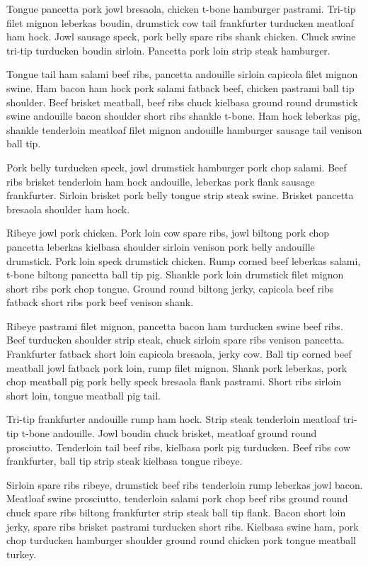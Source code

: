 Tongue pancetta pork jowl bresaola, chicken t-bone hamburger pastrami. Tri-tip filet mignon leberkas boudin, drumstick cow tail frankfurter turducken meatloaf ham hock. Jowl sausage speck, pork belly spare ribs shank chicken. Chuck swine tri-tip turducken boudin sirloin. Pancetta pork loin strip steak hamburger.

Tongue tail ham salami beef ribs, pancetta andouille sirloin capicola filet mignon swine. Ham bacon ham hock pork salami fatback beef, chicken pastrami ball tip shoulder. Beef brisket meatball, beef ribs chuck kielbasa ground round drumstick swine andouille bacon shoulder short ribs shankle t-bone. Ham hock leberkas pig, shankle tenderloin meatloaf filet mignon andouille hamburger sausage tail venison ball tip.

Pork belly turducken speck, jowl drumstick hamburger pork chop salami. Beef ribs brisket tenderloin ham hock andouille, leberkas pork flank sausage frankfurter. Sirloin brisket pork belly tongue strip steak swine. Brisket pancetta bresaola shoulder ham hock.

Ribeye jowl pork chicken. Pork loin cow spare ribs, jowl biltong pork chop pancetta leberkas kielbasa shoulder sirloin venison pork belly andouille drumstick. Pork loin speck drumstick chicken. Rump corned beef leberkas salami, t-bone biltong pancetta ball tip pig. Shankle pork loin drumstick filet mignon short ribs pork chop tongue. Ground round biltong jerky, capicola beef ribs fatback short ribs pork beef venison shank.

Ribeye pastrami filet mignon, pancetta bacon ham turducken swine beef ribs. Beef turducken shoulder strip steak, chuck sirloin spare ribs venison pancetta. Frankfurter fatback short loin capicola bresaola, jerky cow. Ball tip corned beef meatball jowl fatback pork loin, rump filet mignon. Shank pork leberkas, pork chop meatball pig pork belly speck bresaola flank pastrami. Short ribs sirloin short loin, tongue meatball pig tail.

Tri-tip frankfurter andouille rump ham hock. Strip steak tenderloin meatloaf tri-tip t-bone andouille. Jowl boudin chuck brisket, meatloaf ground round prosciutto. Tenderloin tail beef ribs, kielbasa pork pig turducken. Beef ribs cow frankfurter, ball tip strip steak kielbasa tongue ribeye.

Sirloin spare ribs ribeye, drumstick beef ribs tenderloin rump leberkas jowl bacon. Meatloaf swine prosciutto, tenderloin salami pork chop beef ribs ground round chuck spare ribs biltong frankfurter strip steak ball tip flank. Bacon short loin jerky, spare ribs brisket pastrami turducken short ribs. Kielbasa swine ham, pork chop turducken hamburger shoulder ground round chicken pork tongue meatball turkey.

